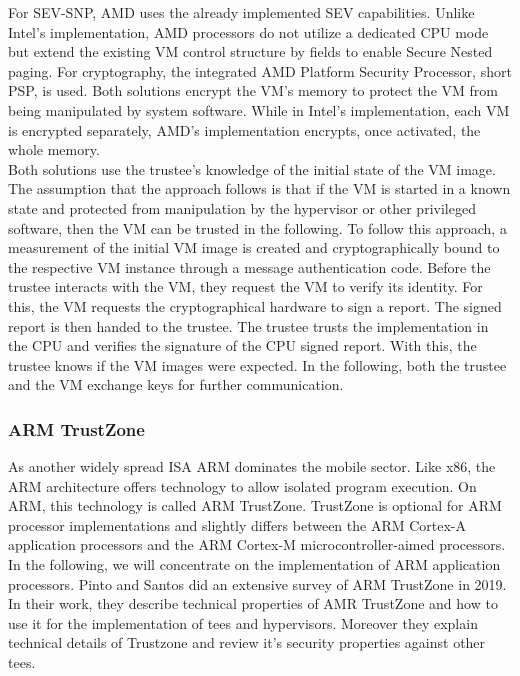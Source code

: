 For SEV-SNP, AMD uses the already implemented SEV capabilities. Unlike Intel's
implementation, AMD processors do not utilize a dedicated CPU mode but extend
the existing VM control structure by fields to enable Secure Nested paging. For
cryptography, the integrated AMD Platform Security Processor, short PSP, is
used. Both solutions encrypt the VM's memory to protect the VM from being
manipulated by system software. While in Intel's implementation, each VM is
encrypted separately, AMD's implementation encrypts, once activated, the whole
memory.\\

Both solutions use the trustee's knowledge of the initial state of the VM image.
The assumption that the approach follows is that if the VM is started in a known
state and protected from manipulation by the hypervisor or other privileged
software, then the VM can be trusted in the following. To follow this approach,
a measurement of the initial VM image is created and cryptographically bound to
the respective VM instance through a message authentication code. Before the
trustee interacts with the VM, they request the VM to verify its identity. For
this, the VM requests the cryptographical hardware to sign a report. The signed
report is then handed to the trustee. The trustee trusts the implementation in
the CPU and verifies the signature of the CPU signed report. With this, the
trustee knows if the VM images were expected. In the following, both the trustee
and the VM exchange keys for further communication.\\

\subsubsection{ARM TrustZone}
\label{sec:20:trustzone}
As another widely spread ISA ARM dominates the mobile sector. Like x86, the ARM
architecture offers technology to allow isolated program execution. On ARM, this
technology is called ARM TrustZone. TrustZone is optional for ARM processor
implementations and slightly differs between the ARM Cortex-A application
processors and the ARM Cortex-M microcontroller-aimed processors. In the
following, we will concentrate on the implementation of ARM application
processors. Pinto and Santos did an extensive survey of ARM TrustZone in 2019.
In their work, they describe technical properties of AMR TrustZone and how to
use it for the implementation of \gls{tee}s and hypervisors. Moreover they
explain technical details of Trustzone and review it's security properties
against other \gls{tee}s.\cite{pinto_demystifying_2019}\\

